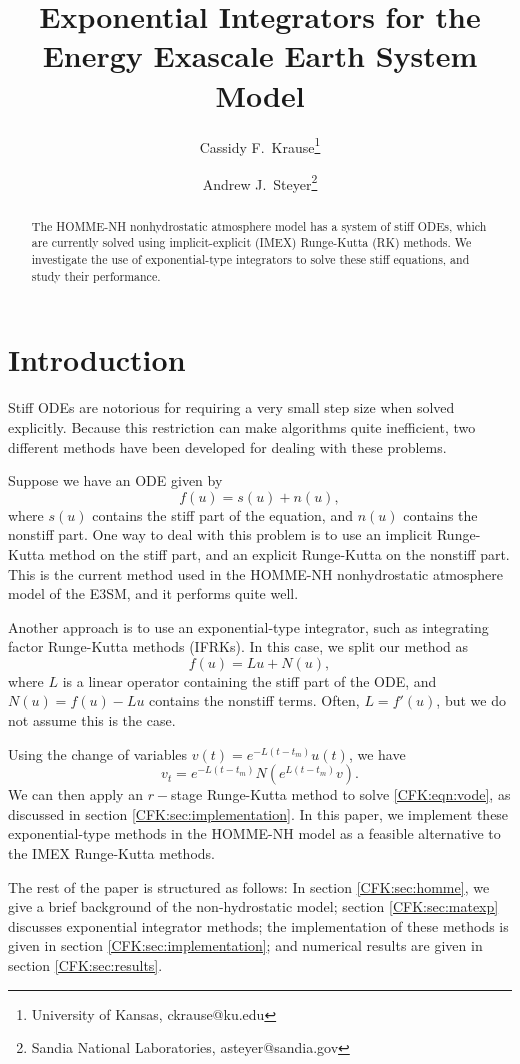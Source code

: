 \documentclass{csri19}
\title{Exponential Integrators for the Energy Exascale Earth System Model}
\author{Cassidy F.\ Krause\thanks{University of Kansas, ckrause@ku.edu}
\and Andrew J.\ Steyer\thanks{Sandia National Laboratories, asteyer@sandia.gov}}
\begin{document}
\maketitle

\begin{abstract}
The HOMME-NH nonhydrostatic atmosphere model has a system of stiff ODEs, 
which are currently solved using implicit-explicit (IMEX) Runge-Kutta (RK) 
methods. We investigate the use of exponential-type integrators to solve 
these stiff equations, and study their performance.
\end{abstract}

\section{Introduction} \label{CFK:sec:intro}
Stiff ODEs are notorious for requiring a very small step size when solved 
explicitly. Because this restriction can make algorithms quite inefficient,
 two different methods have been developed for dealing with these problems. 

Suppose we have an ODE given by \[ f(u) = s(u) + n(u),\] where $s(u)$ 
contains the stiff part of the equation, and $n(u)$ contains the nonstiff 
part. One way to deal with this problem is to use an implicit Runge-Kutta
method on the stiff part, and an explicit Runge-Kutta on the nonstiff part. 
This is the current method used in the HOMME-NH nonhydrostatic atmosphere 
model of the E3SM, and it performs quite well.

Another approach is to use an exponential-type integrator, such as 
integrating factor Runge-Kutta methods (IFRKs). In this case, we split our
 method as \[ f(u) = Lu + N(u),\] where $L$ is a linear operator containing
 the stiff part of the ODE, and $N(u) = f(u) - Lu$ contains the nonstiff 
terms. Often, $L = f'(u)$, but we do not assume this is the case. 

Using the change of variables $v(t) = e^{-L(t-t_m)}u(t)$, we have
\begin{equation}\label{CFK:eqn:vode}
v_t = e^{-L(t-t_m)}N(e^{L(t-t_m)}v).
\end{equation} 
We can then apply an $r-$stage Runge-Kutta method to solve 
\ref{CFK:eqn:vode}, as discussed in section \ref{CFK:sec:implementation}. 
In this paper, we implement these exponential-type methods in the HOMME-NH
 model as a feasible alternative to the IMEX Runge-Kutta methods.

The rest of the paper is structured as follows: In section 
\ref{CFK:sec:homme}, we give a brief background of the non-hydrostatic 
model; section \ref{CFK:sec:matexp} discusses exponential integrator 
methods; the implementation of these methods is given in section 
\ref{CFK:sec:implementation}; and numerical results are given in section 
\ref{CFK:sec:results}.
\end{document}
